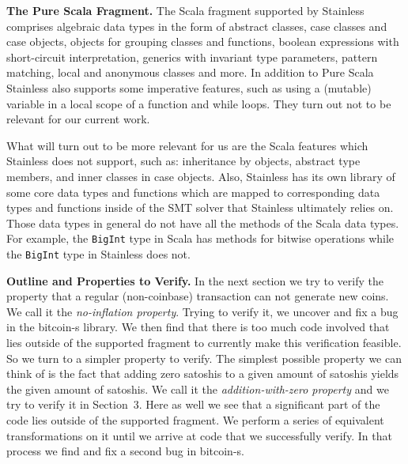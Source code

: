 \documentclass[runningheads]{llncs}
\renewcommand{\paragraph}{\textbf}%
\begin{document}
\paragraph{The Pure Scala Fragment.} The Scala fragment supported by
Stainless comprises algebraic data types in the form of abstract
classes, case classes and case objects, objects for grouping classes
and functions, boolean expressions with short-circuit interpretation,
generics with invariant type parameters, pattern matching, local and
anonymous classes and more.  In addition to Pure Scala Stainless also
supports some imperative features, such as using a (mutable) variable
in a local scope of a function and while loops. They turn out not to
be relevant for our current work.

What will turn out to be more relevant for us are the Scala features
which Stainless does not support, such as: inheritance by objects,
abstract type members, and inner classes in case objects. Also,
Stainless has its own library of some core data types and functions
which are mapped to corresponding data types and functions inside of
the SMT solver that Stainless ultimately relies on. Those data types
in general do not have all the methods of the Scala data types. For
example, the \texttt{BigInt} type in Scala has methods for bitwise
operations while the \texttt{BigInt} type in Stainless does not.

\paragraph{Outline and Properties to Verify.} In the next section we
try to verify the property that a regular (non-coinbase) transaction
can not generate new coins. We call it the \emph{no-inflation
  property}. Trying to verify it, we uncover and fix a bug in the
bitcoin-s library. We then find that there is too much code involved
that lies outside of the supported fragment to currently make this
verification feasible. So we turn to a simpler property to verify. The
simplest possible property we can think of is the fact that adding
zero satoshis to a given amount of satoshis yields the given amount of
satoshis. We call it the \emph{addition-with-zero property} and we try
to verify it in Section~3. Here as well we see that a significant part
of the code lies outside of the supported fragment. We perform a
  series of equivalent transformations on it until we arrive at code that we
  successfully verify. In that process we find and fix a second bug in
  bitcoin-s.
\end{document}
